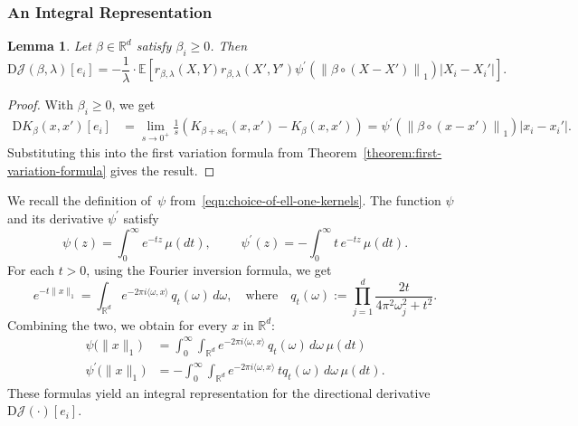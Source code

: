 \documentclass[sn-mathphys-num]{sn-jnl}%
\numberwithin{equation}{section}
\newcommand{\R}{\mathbb{R}}
\newcommand{\E}{\mathbb{E}}
\newcommand{\kernel}{K}
\newcommand{\norm}[1]{\left\|{#1}\right\|} %
\newtheorem{lemma}{Lemma}
\newcommand{\profile}{\psi}
\theoremstyle{thmstyleone}%
\theoremstyle{thmstyletwo}%
\theoremstyle{thmstylethree}%
\begin{document}
\subsubsection{An Integral Representation} 
\label{sec:an-integral-representation}
\vspace{0.5em} 
\begin{lemma}
\label{lemma:first-step}
Let $\beta \in \R^d$ satisfy $\beta_i \ge 0$. Then 
\begin{equation*}
	\mathrm{D}\mathcal{J}(\beta, \lambda)[e_i] = 
		-\frac{1}{\lambda} \cdot \E[r_{\beta, \lambda}(X, Y)r_{\beta, \lambda}(X', Y') \profile^\prime(\norm{\beta\circ(X-X')}_{1})|X_i -X_i'|].
\end{equation*} 
\end{lemma} 
\begin{proof} 
With $\beta_i \ge 0$, we get 
\begin{equation*}
\begin{split} 
	\mathrm{D}\kernel_\beta(x,x')[e_i] &= \lim_{s \to 0^+} \frac{1}{s} (\kernel_{\beta + s e_i} (x, x') - \kernel_\beta(x, x')) 
		= \profile^\prime(\norm{\beta \circ (x-x')}_{1}) |x_i - x_i'|.
\end{split} 
\end{equation*}
Substituting this into the first variation formula from Theorem~\ref{theorem:first-variation-formula} gives the result.
\end{proof} 

We recall the definition of~$\profile$ from~\eqref{eqn:choice-of-ell-one-kernels}.
The function $\profile$ and its derivative $\profile^\prime$ satisfy
\begin{equation*}
	\profile(z) = \int_0^\infty e^{-t z} \, \mu(dt),~~~\quad~~~\profile^\prime(z) =  -\int_0^\infty t\, e^{-t z} \, \mu(dt).
\end{equation*}
For each $t > 0$, using the Fourier inversion formula, we get 
\begin{equation*}
e^{-t\|x\|_1} = \int_{\R^d} e^{-2\pi i \langle \omega, x \rangle} \, q_t(\omega) \, d\omega,
\quad \text{where} \quad 
q_t(\omega) := \prod_{j=1}^d \frac{2t}{4\pi^2 \omega_j^2 + t^2}.
\end{equation*} 
Combining the two, we obtain for every $x$ in $\R^d$:
\begin{equation}
\label{eqn:computation-of-psi-psi-prime}
\begin{split} 
\profile \big(\|x\|_1\big)
&= \int_0^\infty \int_{\R^d} 
e^{-2\pi i \langle \omega, x \rangle} 
\, q_t(\omega) \, d\omega \, \mu(dt) \\
\profile^\prime\big(\|x\|_1\big)
&= -\int_0^\infty \int_{\R^d} 
e^{-2\pi i \langle \omega, x \rangle} 
\, tq_t(\omega) \, d\omega \, \mu(dt).
\end{split} 
\end{equation} 
These formulas yield an integral representation for the directional derivative $\mathrm{D}\mathcal{J}(\cdot)[e_i]$. 
\end{document}
